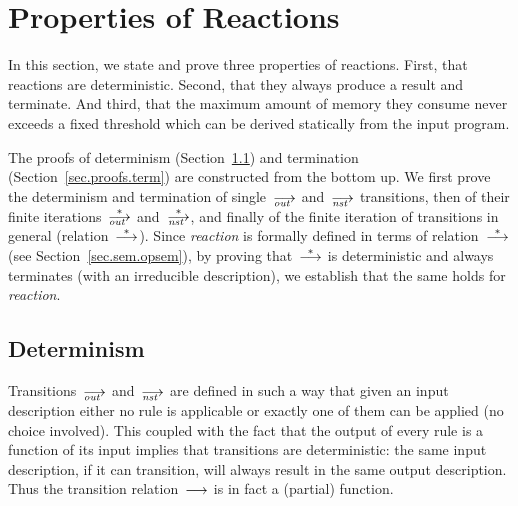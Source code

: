 \section{Properties of \CEU Reactions}
\label{sec.proofs}

In this section, we state and prove three properties of \CEU reactions.
First, that reactions are deterministic.  Second, that they always produce a
result and terminate. And third, that the maximum amount of memory they
consume never exceeds a fixed threshold which can be derived statically from
the input program.


The proofs of determinism (Section~\ref{sec.proofs.det}) and termination
(Section~\ref{sec.proofs.term}) are constructed from the bottom up.  We
first prove the determinism and termination of single~$\out$ and~$\nst$
transitions, then of their finite iterations~$\out[*]$ and~$\nst[*]$, and
finally of the finite iteration of transitions in general
(relation~$\trans[*]$).  Since \emph{reaction} is formally defined in terms
of relation~$\trans[*]$ (see Section~\ref{sec.sem.opsem}), by proving
that~$\trans[*]$ is deterministic and always terminates (with an irreducible
description), we establish that the same holds for \emph{reaction}.




\subsection{Determinism}
\label{sec.proofs.det}

Transitions~$\out$ and~$\nst$ are defined in such a way that given an input
description either no rule is applicable or exactly one of them can be
applied (no choice involved).  This coupled with the fact that the output of
every rule is a function of its input implies that transitions are
deterministic: the same input description, if it can transition, will always
result in the same output description.  Thus the transition
relation~$\trans$ is in fact a (partial) function.

